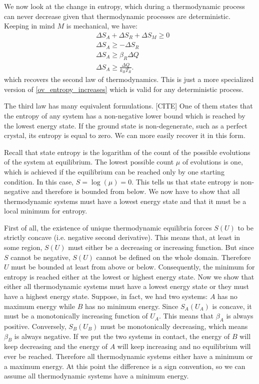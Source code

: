 \documentclass[letterpaper,twocolumn]{article}
\begin{document}
We now look at the change in entropy, which during a thermodynamic process can never decrease given that thermodynamic processes are deterministic. Keeping in mind $M$ is mechanical, we have:
\begin{equation}
\begin{aligned}
&\Delta S_A + \Delta S_R + \Delta S_M \geq 0 \\
&\Delta S_A \geq - \Delta S_R \\
&\Delta S_A \geq \beta_R \Delta Q \\
&\Delta S_A \geq \frac{\Delta Q}{k_B T_R}.
\end{aligned}
\end{equation}
which recovers the second law of thermodynamics. This is just a more specialized version of \eqref{ov_entropy_increases} which is valid for any deterministic process.



The third law has many equivalent formulations. [CITE] One of them states that the entropy of any system has a non-negative lower bound which is reached by the lowest energy state. If the ground state is non-degenerate, such as a perfect crystal, its entropy is equal to zero. We can more easily recover it in this form.

Recall that state entropy is the logarithm of the count of the possible evolutions of the system at equilibrium. The lowest possible count $\mu$ of evolutions is one, which is achieved if the equilibrium can be reached only by one starting condition. In this case, $S=\log(\mu)=0$. This tells us that state entropy is non-negative and therefore is bounded from below. We now have to show that all thermodynamic systems must have a lowest energy state and that it must be a local minimum for entropy.

First of all, the existence of unique thermodynamic equilibria forces $S(U)$ to be strictly concave (i.e. negative second derivative). This means that, at least in some region, $S(U)$ must either be a decreasing or increasing function. But since $S$ cannot be negative, $S(U)$ cannot be defined on the whole domain. Therefore $U$ must be bounded at least from above or below. Consequently, the minimum for entropy is reached either at the lowest or highest energy state. Now we show that either all thermodynamic systems must have a lowest energy state or they must have a highest energy state. Suppose, in fact, we had two systems: $A$ has no maximum energy while $B$ has no minimum energy. Since $S_A(U_A)$ is concave, it must be a monotonically increasing function of $U_A$. This means that $\beta_A$ is always positive. Conversely, $S_B(U_B)$ must be monotonically decreasing, which means $\beta_B$ is always negative. If we put the two systems in contact, the energy of $B$ will keep decreasing and the energy of $A$ will keep increasing and no equilibrium will ever be reached. Therefore all thermodynamic systems either have a minimum or a maximum energy. At this point the difference is a sign convention, so we can assume all thermodynamic systems have a minimum energy.
\end{document}
